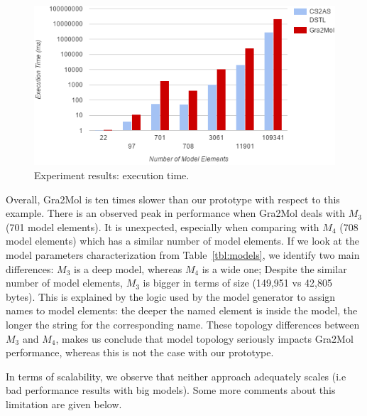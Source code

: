 \documentclass{llncs}
\begin{document}
\begin{figure}[htbp]	
	\centering
	\includegraphics[scale=0.65]{images/Results.PNG}
	\caption{Experiment results: execution time.}
	\label{fig:Results}
\end{figure}

Overall, Gra2Mol is ten times slower than our prototype with respect to this example. There is an observed peak in performance when Gra2Mol deals with $M_3$ (701 model elements). It is unexpected, especially when comparing with $M_4$ (708 model elements) which has a similar number of model elements. If we look at the model parameters characterization from Table~\ref{tbl:models}, we identify two main differences: $M_3$ is a deep model, whereas $M_4$ is a wide one; Despite the similar number of model elements, $M_3$ is bigger in terms of size (149,951 vs 42,805 bytes). This is explained by the logic used by the model generator to assign names to model elements: the deeper the named element is inside the model, the longer the string for the corresponding name. These topology differences between $M_3$ and $M_4$, makes us conclude that model topology seriously impacts Gra2Mol performance, whereas this is not the case with our prototype.


In terms of scalability, we observe that neither approach adequately scales (i.e bad performance results with big models). Some more comments about this limitation are given below.


\end{document}
